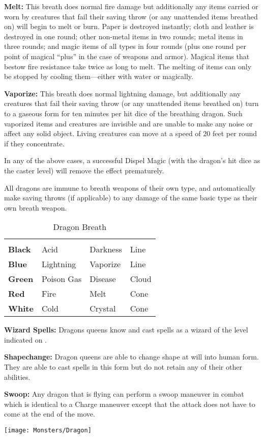 \begin{multicols*}{2}
\textbf{Melt:} This breath does normal fire damage but additionally any items carried or worn by creatures that fail their saving throw (or any unattended items breathed on) will begin to melt or burn. Paper is destroyed instantly; cloth and leather is destroyed in one round; other non-metal items in two rounds; metal items in three rounds; and magic items of all types in four rounds (plus one round per point of magical “plus” in the case of weapons and armor). Magical items that bestow fire resistance take twice as long to melt. The melting of items can only be stopped by cooling them—either with water or magically.

\textbf{Vaporize:} This breath does normal lightning damage, but additionally any creatures that fail their saving throw (or any unattended items breathed on) turn to a gaseous form for ten minutes per hit dice of the breathing dragon. Such vaporized items and creatures are invisible and are unable to make any noise or affect any solid object. Living creatures can move at a speed of 20 feet per round if they concentrate.

In any of the above cases, a successful Dispel Magic (with the dragon’s hit dice as the caster level) will remove the effect prematurely.

All dragons are immune to breath weapons of their own type, and automatically make saving throws (if applicable) to any damage of the same basic type as their own breath weapon.

\begin {table}[H]
  \caption{Dragon Breath}
  \begin{tabularx}{\columnwidth}{>{\bfseries}YYYY}
	 &  &  & \\
	Black & Acid & Darkness & Line\\
	Blue & Lightning & Vaporize & Line\\
	Green & Poison Gas & Disease & Cloud\\
	Red & Fire & Melt & Cone\\
	White & Cold & Crystal & Cone
  \end {tabularx}
\end {table}

\textbf{Wizard Spells:} Dragons queens know and cast spells as a wizard of the level indicated on .

\textbf{Shapechange:} Dragon queens are able to change shape at will into human form. They are able to cast spells in this form but do not retain any of their other abilities.

\textbf{Swoop:} Any dragon that is flying can perform a swoop maneuver in combat which is identical to a Charge maneuver except that the attack does not have to come at the end of the move.

\texttt{[image: Monsters/Dragon]}

\end{multicols*}
